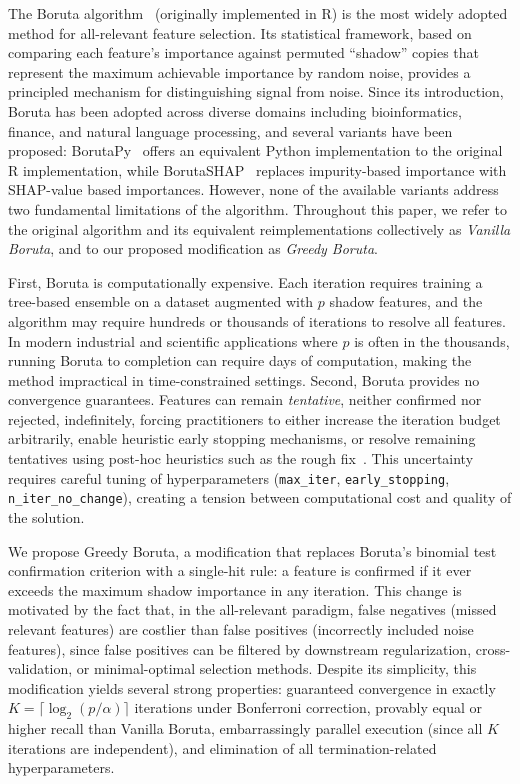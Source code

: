 \documentclass[runningheads]{llncs}
\begin{document}
The Boruta algorithm~\cite{kursa2010feature} (originally implemented in R) is the most widely adopted method for all-relevant feature selection. Its statistical framework, based on comparing each feature's importance against permuted ``shadow'' copies that represent the maximum achievable importance by random noise, provides a principled mechanism for distinguishing signal from noise. Since its introduction, Boruta has been adopted across diverse domains including bioinformatics, finance, and natural language processing, and several variants have been proposed: BorutaPy~\cite{borutapy} offers an equivalent Python implementation to the original R implementation, while BorutaSHAP~\cite{borutashap} replaces impurity-based importance with SHAP-value based importances. However, none of the available variants address two fundamental limitations of the algorithm. Throughout this paper, we refer to the original algorithm and its equivalent reimplementations collectively as \emph{Vanilla Boruta}, and to our proposed modification as \emph{Greedy Boruta}.

First, Boruta is computationally expensive. Each iteration requires training a tree-based ensemble on a dataset augmented with $p$ shadow features, and the algorithm may require hundreds or thousands of iterations to resolve all features. In modern industrial and scientific applications where $p$ is often in the thousands, running Boruta to completion can require days of computation, making the method impractical in time-constrained settings. Second, Boruta provides no convergence guarantees. Features can remain \emph{tentative}, neither confirmed nor rejected, indefinitely, forcing practitioners to either increase the iteration budget arbitrarily, enable heuristic early stopping mechanisms, or resolve remaining tentatives using post-hoc heuristics such as the rough fix~\cite{kursa2010feature}. This uncertainty requires careful tuning of hyperparameters (\texttt{max\_iter}, \texttt{early\_stopping}, \texttt{n\_iter\_no\_change}), creating a tension between computational cost and quality of the solution.

We propose Greedy Boruta, a modification that replaces Boruta's binomial test confirmation criterion with a single-hit rule: a feature is confirmed if it ever exceeds the maximum shadow importance in any iteration. This change is motivated by the fact that, in the all-relevant paradigm, false negatives (missed relevant features) are costlier than false positives (incorrectly included noise features), since false positives can be filtered by downstream regularization, cross-validation, or minimal-optimal selection methods. Despite its simplicity, this modification yields several strong properties: guaranteed convergence in exactly $K = \lceil \log_2(p/\alpha) \rceil$ iterations under Bonferroni correction, provably equal or higher recall than Vanilla Boruta, embarrassingly parallel execution (since all $K$ iterations are independent), and elimination of all termination-related hyperparameters.
\end{document}
